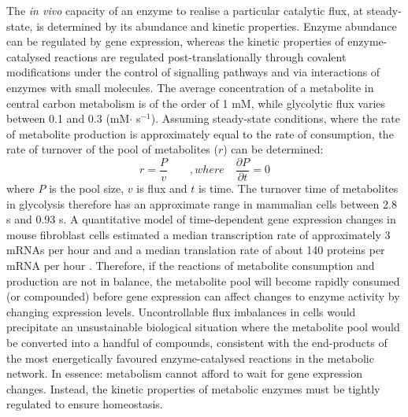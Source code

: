 The \textit{in vivo} capacity of an enzyme to realise a particular catalytic flux, at steady-state, is determined by its abundance and kinetic properties. Enzyme abundance can be regulated by gene expression, whereas the kinetic properties of enzyme-catalysed reactions are regulated post-translationally through covalent modifications under the control of signalling pathways and via interactions of enzymes with small molecules. The average concentration of a metabolite in central carbon metabolism is of the order of 1 mM, while glycolytic flux varies between 0.1 and 0.3 (mM$\cdot$ s$^{-1}$).\cite{Tanner:2018aa} Assuming steady-state conditions, where the rate of metabolite production is approximately equal to the rate of consumption, the rate of turnover of the pool of metabolites ($r$) can be determined:
%
%
\begin{equation}
r = \frac{P}{v} \qquad ,where \quad \frac{\partial P}{\partial t} = 0
\end{equation}
%
%
where $P$ is the pool size, $v$ is flux and $t$ is time. The turnover time of metabolites in glycolysis therefore has an approximate range in mammalian cells between 2.8 s and 0.93 s. A quantitative model of time-dependent gene expression changes in mouse fibroblast cells estimated a median transcription rate of approximately 3 mRNAs per hour and and a median translation rate of about 140 proteins per mRNA per hour \cite{Schwanhausser:2011aa}. Therefore, if the reactions of metabolite consumption and production are not in balance, the metabolite pool will become rapidly consumed (or compounded) before gene expression can affect changes to enzyme activity by changing expression levels. Uncontrollable flux imbalances in cells would precipitate an unsustainable biological situation where the metabolite pool would be converted into a handful of compounds, consistent with the end-products of the most energetically favoured enzyme-catalysed reactions in the metabolic network. In essence: metabolism cannot afford to wait for gene expression changes. Instead, the kinetic properties of metabolic enzymes must be tightly regulated to ensure homeostasis.
%
%
\\\\
%
%  
